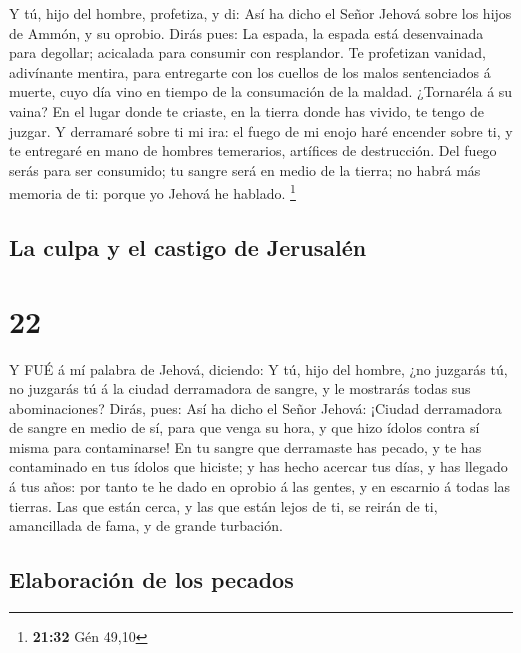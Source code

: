  Y tú, hijo del hombre, profetiza, y di: Así ha dicho el
Señor Jehová sobre los hijos de Ammón, y su oprobio. Dirás pues: La
espada, la espada está desenvainada para degollar; acicalada para
consumir con resplandor.  Te profetizan vanidad, adivínante
mentira, para entregarte con los cuellos de los malos sentenciados á
muerte, cuyo día vino en tiempo de la consumación de la maldad.
 ¿Tornaréla á su vaina? En el lugar donde te criaste, en la
tierra donde has vivido, te tengo de juzgar.  Y derramaré
sobre ti mi ira: el fuego de mi enojo haré encender sobre ti, y te
entregaré en mano de hombres temerarios, artífices de destrucción.
 Del fuego serás para ser consumido; tu sangre será en
medio de la tierra; no habrá más memoria de ti: porque yo Jehová he
hablado. \footnote{\textbf{21:32} Gén 49,10}

\hypertarget{la-culpa-y-el-castigo-de-jerusaluxe9n}{%
\subsection{La culpa y el castigo de
Jerusalén}\label{la-culpa-y-el-castigo-de-jerusaluxe9n}}

\hypertarget{section-21}{%
\section{22}\label{section-21}}

 Y FUÉ á mí palabra de Jehová, diciendo:  Y tú,
hijo del hombre, ¿no juzgarás tú, no juzgarás tú á la ciudad derramadora
de sangre, y le mostrarás todas sus abominaciones?  Dirás,
pues: Así ha dicho el Señor Jehová: ¡Ciudad derramadora de sangre en
medio de sí, para que venga su hora, y que hizo ídolos contra sí misma
para contaminarse!  En tu sangre que derramaste has pecado,
y te has contaminado en tus ídolos que hiciste; y has hecho acercar tus
días, y has llegado á tus años: por tanto te he dado en oprobio á las
gentes, y en escarnio á todas las tierras.  Las que están
cerca, y las que están lejos de ti, se reirán de ti, amancillada de
fama, y de grande turbación.

\hypertarget{elaboraciuxf3n-de-los-pecados}{%
\subsection{Elaboración de los
pecados}\label{elaboraciuxf3n-de-los-pecados}}

